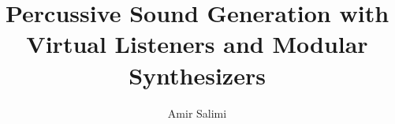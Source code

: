 \documentclass[12pt]{report}
\title{Percussive Sound Generation with Virtual Listeners and Modular Synthesizers}
\author{Amir Salimi}
\newcommand{\onlyinsubfile}[1]{#1}
\newcommand{\notinsubfile}[1]{}
\begin{document}
\renewcommand{\onlyinsubfile}[1]{}
\renewcommand{\notinsubfile}[1]{#1}

\preamblepagenumbering %
\titlepage %



\doublespacing

% 

%


\singlespacing %
               
\tableofcontents
\listoftables  %
\listoffigures %

               
               
\doublespacing

\setforbodyoftext %
\end{document}
